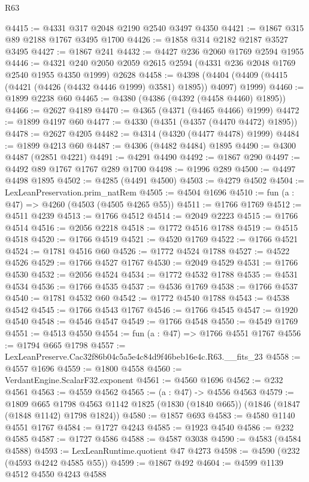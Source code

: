 \begin{lexlean}{R63}
\begin{coremodule}
@4415 := @4331 @317 @2048 @2190 @2540 @3497 @4350
@4421 := @1867 @315 @89 @2188 @1767 @3495 @1700
@4426 := @1858 @314 @2182 @2187 @3527 @3495
@4427 := @1867 @241
@4432 := @4427 @236 @2060 @1769 @2594 @1955
@4446 := @4321 @240 @2050 @2059 @2615 @2594 (@4331 @236 @2048 @1769 @2540 @1955 @4350 @1999) @2628
@4458 := @4398 (@4404 (@4409 (@4415 (@4421 (@4426 (@4432 @4446 @1999) @3581) @1895)) @4097) @1999)
@4460 := @1899 @2238 @60
@4465 := @4380 (@4386 (@4392 (@4458 @4460) @1895))
@4466 := @2627 @4189
@4470 := @4365 (@4371 (@4465 @4466) @1999)
@4472 := @1899 @4197 @60
@4477 := @4330 (@4351 (@4357 (@4470 @4472) @1895))
@4478 := @2627 @4205
@4482 := @4314 (@4320 (@4477 @4478) @1999)
@4484 := @1899 @4213 @60
@4487 := @4306 (@4482 @4484) @1895
@4490 := @4300 @4487 (@2851 @4221)
@4491 := @4291 @4490
@4492 := @1867 @290
@4497 := @4492 @89 @1767 @1767 @289 @1700
@4498 := @1996 @289
@4500 := @4497 @4498 @1895
@4502 := @4285 (@4491 @4500)
@4503 := @4279 @4502
@4504 := LexLeanPreservation.prim_natRem
@4505 := @4504 @1696
@4510 := fun (a : @47) => @4260 (@4503 (@4505 @4265 @55))
@4511 := @1766 @1769
@4512 := @4511 @4239
@4513 := @1766 @4512
@4514 := @2049 @2223
@4515 := @1766 @4514
@4516 := @2056 @2218
@4518 := @1772 @4516 @1788
@4519 := @4515 @4518
@4520 := @1766 @4519
@4521 := @4520 @1769
@4522 := @1766 @4521
@4524 := @1781 @4516 @60
@4526 := @1772 @4524 @1788
@4527 := @4522 @4526
@4529 := @1766 @4527 @1767
@4530 := @2049 @4529
@4531 := @1766 @4530
@4532 := @2056 @4524
@4534 := @1772 @4532 @1788
@4535 := @4531 @4534
@4536 := @1766 @4535
@4537 := @4536 @1769
@4538 := @1766 @4537
@4540 := @1781 @4532 @60
@4542 := @1772 @4540 @1788
@4543 := @4538 @4542
@4545 := @1766 @4543 @1767
@4546 := @1766 @4545
@4547 := @1920 @4540
@4548 := @4546 @4547
@4549 := @1766 @4548
@4550 := @4549 @1769
@4551 := @4513 @4550
@4554 := fun (a : @47) => @1766 @4551 @1767
@4556 := @1794 @665 @1798
@4557 := LexLeanPreserve.Cac32f86b04c5a5e4c84d9f46beb16e4c.R63.__fits_23
@4558 := @4557 @1696
@4559 := @1800 @4558
@4560 := VerdantEngine.ScalarF32.exponent
@4561 := @4560 @1696
@4562 := @232 @4561
@4563 := @4559 @4562
@4565 := (a : @47) -> @4556 @4563
@4579 := @1809
    @665
    @1798
    @4563
    @1142
    @1825
    (@1830 (@1840 @665))
    (@1846 (@1847 (@1848 @1142) @1798 @1824))
@4580 := @1857 @693
@4583 := @4580 @1140 @4551 @1767
@4584 := @1727 @4243
@4585 := @1923 @4540
@4586 := @232 @4585
@4587 := @1727 @4586
@4588 := @4587 @3038
@4590 := @4583 (@4584 @4588)
@4593 := LexLeanRuntime.quotient @47 @4273
@4598 := @4590 (@232 (@4593 @4242 @4585 @55))
@4599 := @1867 @492
@4604 := @4599 @1139 @4512 @4550 @4243 @4588

\end{coremodule}
\end{lexlean}
